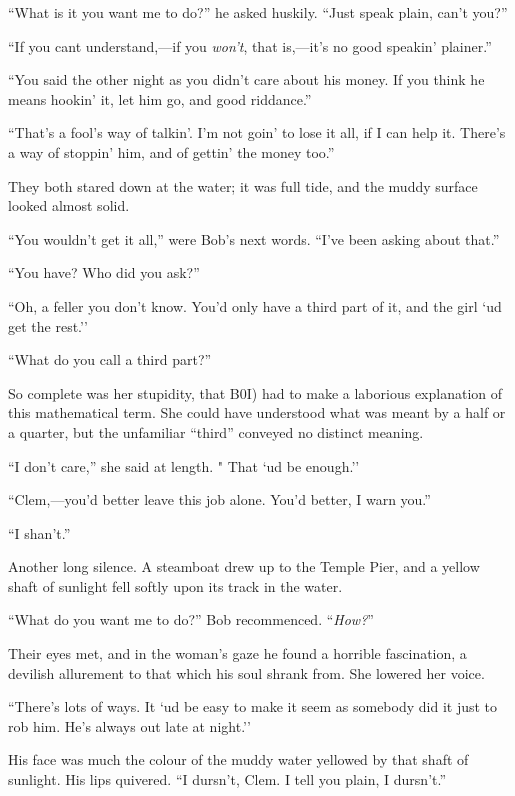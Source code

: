 ``What is it you want me to do?'' he asked huskily. ``Just speak plain,
can't you?''

``If you cant understand,---if you \emph{won't}, that is,---it's no good
speakin' plainer.''

``You said the other night as you didn't care about his money. If you
think he means hookin' it, let him go, and good riddance.''

``That's a fool's way of talkin'. I'm not goin' to lose it all, if I can
help it. There's a way of stoppin' him, and of gettin' the money too.''

They both stared down at the water; it
{\protect\hypertarget{183}{}{}}was full tide, and the muddy surface
looked almost solid.

``You wouldn't get it all,'' were Bob's next words. ``I've been asking
about that.''

``You have? Who did you ask?''

``Oh, a feller you don't know. You'd only have a third part of it, and
the girl `ud get the rest.''

``What do you call a third part?''

So complete was her stupidity, that B0I) had to make a laborious
explanation of this mathematical term. She could have understood what
was meant by a half or a quarter, but the unfamiliar ``third'' conveyed
no distinct meaning.

``I don't care,'' she said at length. " That `ud be enough.''

``Clem,---you'd better leave this job alone. You'd better, I warn you.''

``I shan't.''

Another long silence. A steamboat drew up to the Temple Pier, and a
yellow shaft of sunlight fell softly upon its track in the water.

``What do you want me to do?'' Bob recommenced. ``\emph{How?}''

Their eyes met, and in the woman's gaze he
{\protect\hypertarget{184}{}{}}found a horrible fascination, a devilish
allurement to that which his soul shrank from. She lowered her voice.

``There's lots of ways. It `ud be easy to make it seem as somebody did
it just to rob him. He's always out late at night.''

His face was much the colour of the muddy water yellowed by that shaft
of sunlight. His lips quivered. ``I dursn't, Clem. I tell you plain, I
dursn't.''

